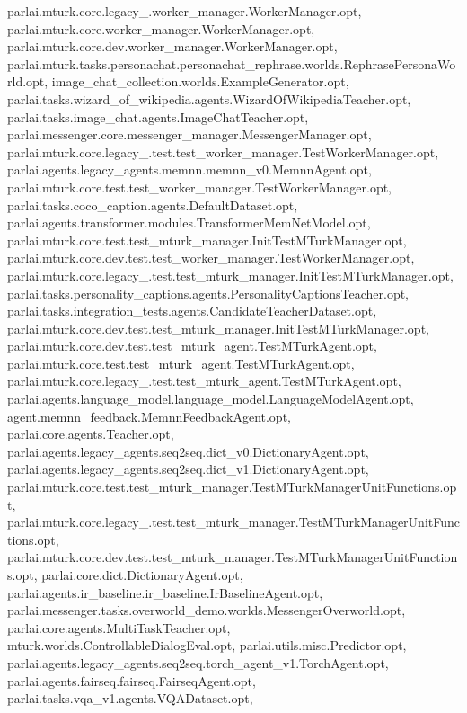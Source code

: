 parlai.\+mturk.\+core.\+legacy\+\_.\+worker\+\_\+manager.\+Worker\+Manager.\+opt, parlai.\+mturk.\+core.\+worker\+\_\+manager.\+Worker\+Manager.\+opt, parlai.\+mturk.\+core.\+dev.\+worker\+\_\+manager.\+Worker\+Manager.\+opt, parlai.\+mturk.\+tasks.\+personachat.\+personachat\+\_\+rephrase.\+worlds.\+Rephrase\+Persona\+World.\+opt, image\+\_\+chat\+\_\+collection.\+worlds.\+Example\+Generator.\+opt, parlai.\+tasks.\+wizard\+\_\+of\+\_\+wikipedia.\+agents.\+Wizard\+Of\+Wikipedia\+Teacher.\+opt, parlai.\+tasks.\+image\+\_\+chat.\+agents.\+Image\+Chat\+Teacher.\+opt, parlai.\+messenger.\+core.\+messenger\+\_\+manager.\+Messenger\+Manager.\+opt, parlai.\+mturk.\+core.\+legacy\+\_.\+test.\+test\+\_\+worker\+\_\+manager.\+Test\+Worker\+Manager.\+opt, parlai.\+agents.\+legacy\+\_\+agents.\+memnn.\+memnn\+\_\+v0.\+Memnn\+Agent.\+opt, parlai.\+mturk.\+core.\+test.\+test\+\_\+worker\+\_\+manager.\+Test\+Worker\+Manager.\+opt, parlai.\+tasks.\+coco\+\_\+caption.\+agents.\+Default\+Dataset.\+opt, parlai.\+agents.\+transformer.\+modules.\+Transformer\+Mem\+Net\+Model.\+opt, parlai.\+mturk.\+core.\+test.\+test\+\_\+mturk\+\_\+manager.\+Init\+Test\+M\+Turk\+Manager.\+opt, parlai.\+mturk.\+core.\+dev.\+test.\+test\+\_\+worker\+\_\+manager.\+Test\+Worker\+Manager.\+opt, parlai.\+mturk.\+core.\+legacy\+\_.\+test.\+test\+\_\+mturk\+\_\+manager.\+Init\+Test\+M\+Turk\+Manager.\+opt, parlai.\+tasks.\+personality\+\_\+captions.\+agents.\+Personality\+Captions\+Teacher.\+opt, parlai.\+tasks.\+integration\+\_\+tests.\+agents.\+Candidate\+Teacher\+Dataset.\+opt, parlai.\+mturk.\+core.\+dev.\+test.\+test\+\_\+mturk\+\_\+manager.\+Init\+Test\+M\+Turk\+Manager.\+opt, parlai.\+mturk.\+core.\+dev.\+test.\+test\+\_\+mturk\+\_\+agent.\+Test\+M\+Turk\+Agent.\+opt, parlai.\+mturk.\+core.\+test.\+test\+\_\+mturk\+\_\+agent.\+Test\+M\+Turk\+Agent.\+opt, parlai.\+mturk.\+core.\+legacy\+\_.\+test.\+test\+\_\+mturk\+\_\+agent.\+Test\+M\+Turk\+Agent.\+opt, parlai.\+agents.\+language\+\_\+model.\+language\+\_\+model.\+Language\+Model\+Agent.\+opt, agent.\+memnn\+\_\+feedback.\+Memnn\+Feedback\+Agent.\+opt, parlai.\+core.\+agents.\+Teacher.\+opt, parlai.\+agents.\+legacy\+\_\+agents.\+seq2seq.\+dict\+\_\+v0.\+Dictionary\+Agent.\+opt, parlai.\+agents.\+legacy\+\_\+agents.\+seq2seq.\+dict\+\_\+v1.\+Dictionary\+Agent.\+opt, parlai.\+mturk.\+core.\+test.\+test\+\_\+mturk\+\_\+manager.\+Test\+M\+Turk\+Manager\+Unit\+Functions.\+opt, parlai.\+mturk.\+core.\+legacy\+\_.\+test.\+test\+\_\+mturk\+\_\+manager.\+Test\+M\+Turk\+Manager\+Unit\+Functions.\+opt, parlai.\+mturk.\+core.\+dev.\+test.\+test\+\_\+mturk\+\_\+manager.\+Test\+M\+Turk\+Manager\+Unit\+Functions.\+opt, parlai.\+core.\+dict.\+Dictionary\+Agent.\+opt, parlai.\+agents.\+ir\+\_\+baseline.\+ir\+\_\+baseline.\+Ir\+Baseline\+Agent.\+opt, parlai.\+messenger.\+tasks.\+overworld\+\_\+demo.\+worlds.\+Messenger\+Overworld.\+opt, parlai.\+core.\+agents.\+Multi\+Task\+Teacher.\+opt, mturk.\+worlds.\+Controllable\+Dialog\+Eval.\+opt, parlai.\+utils.\+misc.\+Predictor.\+opt, parlai.\+agents.\+legacy\+\_\+agents.\+seq2seq.\+torch\+\_\+agent\+\_\+v1.\+Torch\+Agent.\+opt, parlai.\+agents.\+fairseq.\+fairseq.\+Fairseq\+Agent.\+opt, parlai.\+tasks.\+vqa\+\_\+v1.\+agents.\+V\+Q\+A\+Dataset.\+opt, 